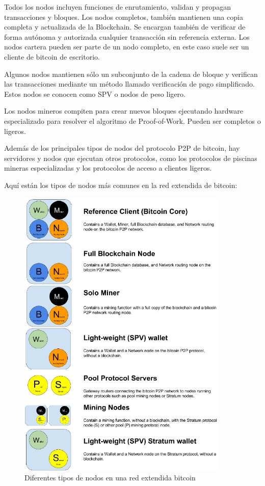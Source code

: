 \vspace{5mm}

\noindent Todos los nodos incluyen funciones de enrutamiento, validan y propagan transacciones y bloques. Los nodos 
completos, también mantienen una copia completa y actualizada de la Blockchain. Se encargan también de verificar de 
forma autónoma y autorizada cualquier transacción sin referencia externa. Los nodos cartera pueden ser parte de un
nodo completo, en este caso suele ser un cliente de bitcoin de escritorio.

\vspace{5mm}

\noindent Algunos nodos mantienen sólo un subconjunto de la cadena de bloque y verifican las transacciones mediante un 
método llamado verificación de pago simplificado. Estos nodos se conocen como SPV o nodos de peso ligero.

\vspace{5mm}

\noindent Los nodos mineros compiten para crear nuevos bloques ejecutando hardware especializado para resolver el 
algoritmo de Proof-of-Work. Pueden ser completos o ligeros.

\vspace{5mm}

\noindent Además de los principales tipos de nodos del protocolo P2P de bitcoin, hay servidores y nodos que ejecutan 
otros protocolos, como los protocolos de piscinas mineras especializadas y los protocolos de acceso a clientes ligeros. 

\newpage

\noindent Aquí están los tipos de nodos más comunes en la red extendida de bitcoin:

\begin{figure}[ht!]
    \centering
    \includegraphics[width=10cm]{imagenes/introduccion/diferentes_nodos_red_extendida}
    \caption{Diferentes tipos de nodos en una red extendida bitcoin}
\end{figure}

